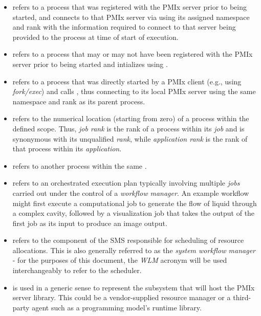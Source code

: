 \begin{itemize}
\item {} refers to a process that was registered with the \ac{PMIx} server prior to being started, and connects to that \ac{PMIx} server via  using its assigned namespace and rank with the information required to connect to that server being provided to the process at time of start of execution.

\item {} refers to a process that may or may not have been registered with the \ac{PMIx} server prior to being started and intializes using .

\item {} refers to a process that was directly started by a \ac{PMIx} client (e.g., using \emph{fork/exec}) and calls , thus connecting to its local \ac{PMIx} server using the same namespace and rank as its parent process.

\item {} refers to the numerical location (starting from zero) of a process within the defined scope. Thus, \emph{job rank} is the rank of a process within its \emph{job} and is synonymous with its unqualified \emph{rank}, while \emph{application rank} is the rank of that process within its \emph{application}.

\item {} refers to another process within the same .

\item {} refers to an orchestrated execution plan typically involving multiple \emph{jobs} carried out under the control of a \emph{workflow manager}. An example workflow might first execute a computational job to generate the flow of liquid through a complex cavity, followed by a visualization job that takes the output of the first job as its input to produce an image output.

\item {} refers to the component of the \ac{SMS} responsible for scheduling of resource allocations. This is also generally referred to as the \emph{system workflow manager} - for the purposes of this document, the \emph{WLM} acronym will be used interchangeably to refer to the scheduler.

\item {} is used in a generic sense to represent the subsystem that will host the \ac{PMIx} server library. This could be a vendor-supplied resource manager or a third-party agent such as a programming model's runtime library.


\end{itemize}
